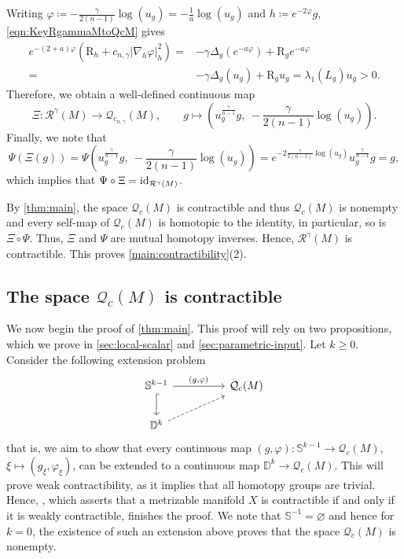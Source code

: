 \documentclass[11pt]{amsart}
\numberwithin{equation}{section}
\newcommand{\Riem}{\mathcal{R}}
\newcommand{\scal}{\mathrm{R}}
\newcommand{\Q}{\mathcal Q}
\let\geq\geqslant
\begin{document}
Writing $\varphi\coloneqq-\tfrac{\gamma}{2(n-1)} \log(u_g) = -\tfrac{1}{a}\log(u_g)$ and $h\coloneqq e^{-2\varphi} g$, \eqref{eqn:KeyRgammaMtoQcM} gives
\begin{align*}
  e^{-(2+a)\varphi}\left(\scal_{h} + c_{n,\gamma}|\nabla_h\varphi |_{h}^2\right) ={}& -\gamma\Delta_g(e^{-a\varphi})+\scal_ge^{-a\varphi}\\
    ={}& -\gamma\Delta_g(u_g)+\scal_gu_g = \lambda_1(L_g) u_g >0.
\end{align*} 
Therefore, we obtain a well-defined continuous map 
\[
\Xi\colon\Riem^\gamma(M)\to\Q_{c_{n,\gamma}}(M),\qquad g\mapsto \left(u_g^{\frac{\gamma}{n-1}} g,\ -\frac{\gamma}{2(n-1)}\log(u_g)\right).
\]
Finally, we note that
\[
\Psi(\Xi(g)) = \Psi\left(u_g^{\frac{\gamma}{n-1}} g,\  -\frac{\gamma}{2(n-1)}\log(u_g)\right) = e^{-2\frac{\gamma}{2(n-1)}\log(u_g)}u_g^{\frac{\gamma}{n-1}} g = g,
\]
which implies that $\Psi\circ\Xi={\rm id}_{\Riem^\gamma(M)}$.


By \cref{thm:main}, the space $\Q_c(M)$ is contractible and thus $\Q_c(M)$ is nonempty and every self-map of $\Q_c(M)$ is homotopic to the identity,
in particular, so is $\Xi\circ\Psi$.
Thus, $\Xi$ and $\Psi$ are mutual homotopy inverses. Hence, $\Riem^\gamma(M)$ is contractible. This proves \cref{main:contractibility}(2).
    
\subsection{The space \texorpdfstring{$\Q_c(M)$}{QcM} is contractible}\label{sec:qc-contractible}
We now begin the proof of \cref{thm:main}.
This proof will rely on two propositions, which we prove in \cref{sec:local-scalar} and \cref{sec:parametric-input}. Let $k\geq 0$.
Consider the following extension problem
\[\begin{tikzcd}
    \mathbb S^{k-1} \arrow[rr, "{(g,\varphi)}"] \arrow[d, hook]
      & & \Q_c(M) \\
    \mathbb D^k \arrow[rru,dashed] 
\end{tikzcd}\]
that is, we aim to show that every continuous map $(g,\varphi)\colon \mathbb S^{k-1}\to\Q_c(M)$, $\xi \mapsto(g_\xi,\varphi_\xi)$, can be extended to a continuous map $\mathbb D^k\to\mathcal{Q}_c(M)$.
This will prove weak contractibility, as it implies that all homotopy groups are trivial.
Hence, \cite[Theorem~15, p.~5]{Palais1966}, which asserts that a metrizable manifold $X$ is
contractible if and only if it is weakly contractible, finishes the proof.
We note that $\mathbb S^{-1}=\varnothing$ and hence for $k=0$, the existence of such an extension above proves that the space $\Q_c(M)$ is nonempty.
\medskip
\end{document}
